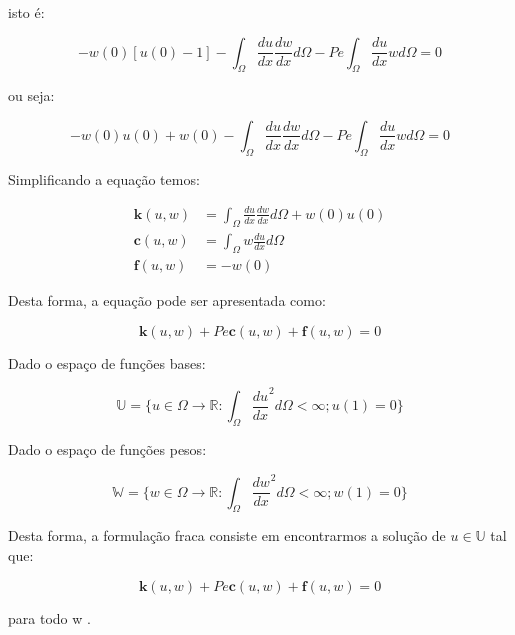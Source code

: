 isto é:

\begin{equation}
 - w(0)[u(0) - 1] - \int_{\Omega} \frac{du}{dx} \frac{dw}{dx} d\Omega 
 - \textit{Pe}\int_{\Omega} \frac{du}{dx}wd\Omega = 0
\end{equation}

ou seja:

\begin{equation}
 - w(0)u(0) + w(0) - \int_{\Omega} \frac{du}{dx} \frac{dw}{dx} d\Omega 
 - \textit{Pe}\int_{\Omega} \frac{du}{dx}wd\Omega = 0
\end{equation}



Simplificando a equação temos:

\begin{equation}
 \begin{align}
  \textbf{k}(u,w) & = \int_\Omega \frac{du}{dx} \frac{dw}{dx} d\Omega + w(0)u(0) \\
  \textbf{c}(u,w) & = \int_\Omega w \frac{du}{dx} d\Omega \\
  \textbf{f}(u,w) & = - w(0) 
 \end{align}
\end{equation}

Desta forma, a equação pode ser apresentada como:

\begin{equation}
 \textbf{k}(u,w) + \textit{Pe}  \textbf{c}(u,w) + \textbf{f}(u,w) = 0
\end{equation}

Dado o espaço de funções bases:

\begin{equation}
 \mathbb{U} = \{u \in \Omega \rightarrow \mathbb{R}
 : \int_\Omega \frac {du}{dx}^2 d\Omega < \infty 
 ; u(1) = 0\}
\end{equation}

Dado o espaço de funções pesos:

\begin{equation}
 \mathbb{W} = \{w \in \Omega \rightarrow \mathbb{R}
 : \int_\Omega \frac {dw}{dx}^2 d\Omega < \infty 
 ; w(1) = 0\}
\end{equation}

Desta forma, a formulação fraca consiste em
encontrarmos a solução de $u \in \mathbb{U}$
tal que:

\begin{equation}
 \textbf{k}(u,w) + \textit{Pe}  \textbf{c}(u,w) + \textbf{f}(u,w) = 0
\end{equation}

para todo w \in {}.
